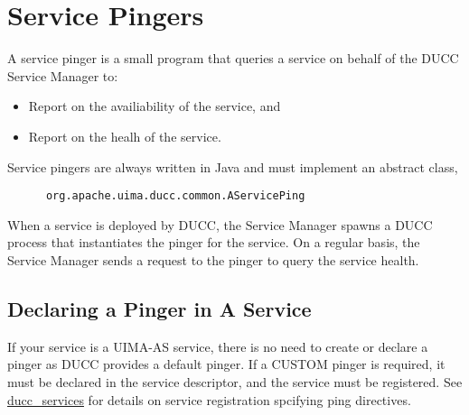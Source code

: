       \section{Service Pingers}
      \label{sec:service.pingers}
      A service pinger is a small program that queries a service on behalf of the
      DUCC Service Manager to:
      \begin{itemize}
        \item Report on the availiability of the service, and
        \item Report on the healh of the service.
      \end{itemize}
      
      Service pingers are always written in Java and must implement an abstract class,
\begin{verbatim}
      org.apache.uima.ducc.common.AServicePing
\end{verbatim}
      When a service is deployed by
      DUCC, the Service Manager spawns a DUCC process that instantiates the pinger for
      the service.  On a regular basis, the Service Manager sends a request to the pinger
      to query the service health.

      \subsection{Declaring a Pinger in A Service}

      If your service is a UIMA-AS service, there is no need to create or declare a pinger as  DUCC
      provides a default pinger.  If a CUSTOM pinger is required, it must be declared in the service
      descriptor, and the service must be registered.  See
      \hyperref[sec:cli.ducc-services]{ducc\_services} for details on service registration spcifying
      ping directives.

